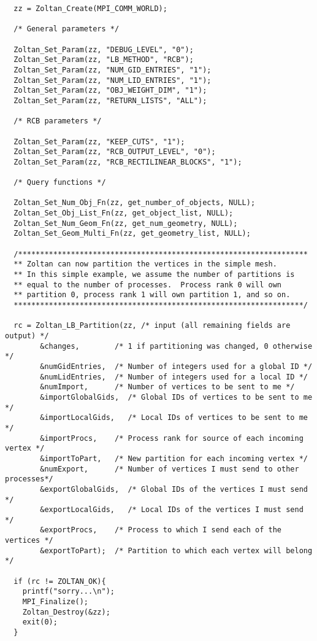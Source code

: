 \begin{verbatim}
  zz = Zoltan_Create(MPI_COMM_WORLD);

  /* General parameters */

  Zoltan_Set_Param(zz, "DEBUG_LEVEL", "0");
  Zoltan_Set_Param(zz, "LB_METHOD", "RCB");
  Zoltan_Set_Param(zz, "NUM_GID_ENTRIES", "1"); 
  Zoltan_Set_Param(zz, "NUM_LID_ENTRIES", "1");
  Zoltan_Set_Param(zz, "OBJ_WEIGHT_DIM", "1");
  Zoltan_Set_Param(zz, "RETURN_LISTS", "ALL");

  /* RCB parameters */

  Zoltan_Set_Param(zz, "KEEP_CUTS", "1"); 
  Zoltan_Set_Param(zz, "RCB_OUTPUT_LEVEL", "0");
  Zoltan_Set_Param(zz, "RCB_RECTILINEAR_BLOCKS", "1"); 

  /* Query functions */

  Zoltan_Set_Num_Obj_Fn(zz, get_number_of_objects, NULL);
  Zoltan_Set_Obj_List_Fn(zz, get_object_list, NULL);
  Zoltan_Set_Num_Geom_Fn(zz, get_num_geometry, NULL);
  Zoltan_Set_Geom_Multi_Fn(zz, get_geometry_list, NULL);

  /******************************************************************
  ** Zoltan can now partition the vertices in the simple mesh.
  ** In this simple example, we assume the number of partitions is
  ** equal to the number of processes.  Process rank 0 will own
  ** partition 0, process rank 1 will own partition 1, and so on.
  ******************************************************************/

  rc = Zoltan_LB_Partition(zz, /* input (all remaining fields are output) */
        &changes,        /* 1 if partitioning was changed, 0 otherwise */ 
        &numGidEntries,  /* Number of integers used for a global ID */
        &numLidEntries,  /* Number of integers used for a local ID */
        &numImport,      /* Number of vertices to be sent to me */
        &importGlobalGids,  /* Global IDs of vertices to be sent to me */
        &importLocalGids,   /* Local IDs of vertices to be sent to me */
        &importProcs,    /* Process rank for source of each incoming vertex */
        &importToPart,   /* New partition for each incoming vertex */
        &numExport,      /* Number of vertices I must send to other processes*/
        &exportGlobalGids,  /* Global IDs of the vertices I must send */
        &exportLocalGids,   /* Local IDs of the vertices I must send */
        &exportProcs,    /* Process to which I send each of the vertices */
        &exportToPart);  /* Partition to which each vertex will belong */

  if (rc != ZOLTAN_OK){
    printf("sorry...\n");
    MPI_Finalize();
    Zoltan_Destroy(&zz);
    exit(0);
  }


\end{verbatim}
